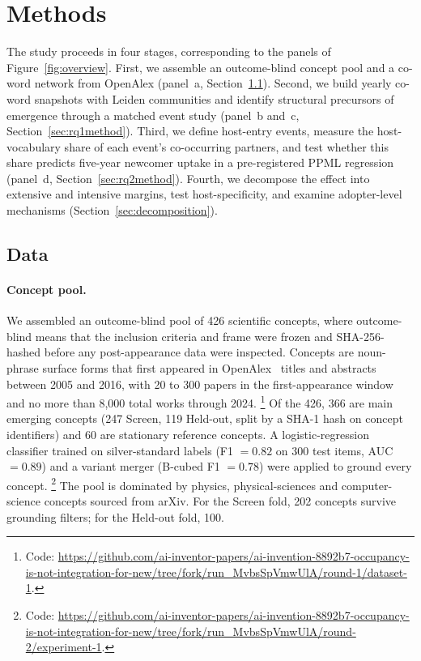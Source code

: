 \documentclass[11pt,letterpaper]{article}
\begin{document}
\section{Methods}
\label{sec:methods}

The study proceeds in four stages, corresponding to the panels of Figure~\ref{fig:overview}.
First, we assemble an outcome-blind concept pool and a co-word network from OpenAlex
(panel~a, Section~\ref{sec:data}). Second, we build yearly co-word snapshots with Leiden
communities and identify structural precursors of emergence through a matched event study
(panel~b and~c, Section~\ref{sec:rq1method}). Third, we define host-entry events, measure
the host-vocabulary share of each event's co-occurring partners, and test whether this share
predicts five-year newcomer uptake in a pre-registered PPML regression
(panel~d, Section~\ref{sec:rq2method}). Fourth, we decompose the effect into extensive and
intensive margins, test host-specificity, and examine adopter-level mechanisms
(Section~\ref{sec:decomposition}).

\subsection{Data}
\label{sec:data}

\paragraph{Concept pool.} We assembled an outcome-blind pool of 426 scientific concepts, where
outcome-blind means that the inclusion criteria and frame were frozen and SHA-256-hashed before any
post-appearance data were inspected. Concepts are noun-phrase surface forms that first appeared in
OpenAlex~\citep{Priem2022} titles and abstracts between 2005 and 2016, with 20 to 300 papers in the
first-appearance window and no more than 8,000 total works through 2024.%
\footnote{Code: \url{https://github.com/ai-inventor-papers/ai-invention-8892b7-occupancy-is-not-integration-for-new/tree/fork/run_MvbsSpVmwUlA/round-1/dataset-1}.}
Of the 426, 366 are main emerging concepts (247 Screen, 119 Held-out, split by a SHA-1 hash on concept
identifiers) and 60 are stationary reference concepts. A logistic-regression classifier trained on
silver-standard labels (F1 $= 0.82$ on 300 test items, AUC $= 0.89$) and a variant merger (B-cubed
F1 $= 0.78$) were applied to ground every concept.%
\footnote{Code: \url{https://github.com/ai-inventor-papers/ai-invention-8892b7-occupancy-is-not-integration-for-new/tree/fork/run_MvbsSpVmwUlA/round-2/experiment-1}.}
The pool is dominated by physics, physical-sciences and computer-science concepts sourced from arXiv.
For the Screen fold, 202 concepts survive grounding filters; for the Held-out fold, 100.
\end{document}
